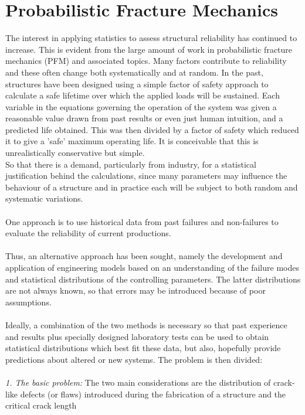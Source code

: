 \documentclass[12pt]{article}
\begin{document}
\section{Probabilistic Fracture Mechanics}
The interest in applying statistics to assess structural reliability has continued to
increase. This is evident from the large amount of work in
probabilistic fracture mechanics (PFM) and associated topics.
Many factors contribute to reliability and these often change both systematically
and at random. In the past, structures have been designed using a simple factor of
safety approach to calculate a safe lifetime over which the applied loads will be
sustained. Each variable in the equations governing the operation of the system was given a reasonable
value drawn from past results or even just human intuition, and a predicted life
obtained. This was then divided by a factor of safety which reduced it to give a 'safe'
maximum operating life. It is conceivable that this is unrealistically conservative but simple.\\
So that there is a demand,
particularly from industry, for a statistical justification behind the calculations,
since many parameters may influence the behaviour of a structure and in practice
each will be subject to both random and systematic variations.\\\\
One approach is to use historical data from past failures and non-failures to
evaluate the reliability of current productions.\\\\
Thus, an alternative approach has been sought, namely the development and
application of engineering models based on an understanding of the failure modes
and statistical distributions of the controlling parameters. The latter distributions
are not always known, so that errors may be introduced because of poor
assumptions.\\\\
Ideally, a combination of the two methods is necessary so that past experience
and results plus specially designed laboratory tests can be used to obtain statistical
distributions which best fit these data, but also, hopefully provide predictions about
altered or new systems. The problem is then divided:\\\\
{\it 1. The basic problem:}
The two main considerations are the distribution of crack-like defects (or flaws)
introduced during the fabrication of a structure and the critical crack length
\end{document}
